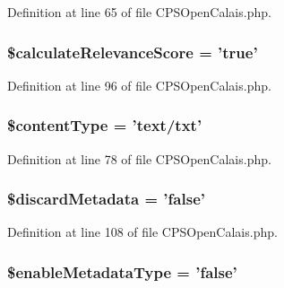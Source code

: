 Definition at line 65 of file CPSOpenCalais.php.

\hypertarget{classCPSOpenCalais_a32ea2c52cbe7a0febc8be98c7ca57195}{
\subsubsection[{\$calculateRelevanceScore}]{\setlength{\rightskip}{0pt plus 5cm}\$calculateRelevanceScore = 'true'}}
\label{classCPSOpenCalais_a32ea2c52cbe7a0febc8be98c7ca57195}


Definition at line 96 of file CPSOpenCalais.php.

\hypertarget{classCPSOpenCalais_ab8c052d0ddebb9f14151f8682916a587}{
\subsubsection[{\$contentType}]{\setlength{\rightskip}{0pt plus 5cm}\$contentType = 'text/txt'}}
\label{classCPSOpenCalais_ab8c052d0ddebb9f14151f8682916a587}


Definition at line 78 of file CPSOpenCalais.php.

\hypertarget{classCPSOpenCalais_a0e3c2633bd75ee4bdb9bc4ad0e498a0c}{
\subsubsection[{\$discardMetadata}]{\setlength{\rightskip}{0pt plus 5cm}\$discardMetadata = 'false'}}
\label{classCPSOpenCalais_a0e3c2633bd75ee4bdb9bc4ad0e498a0c}


Definition at line 108 of file CPSOpenCalais.php.

\hypertarget{classCPSOpenCalais_a465299fb5bd9cc610d83d8cc162a69ef}{
\subsubsection[{\$enableMetadataType}]{\setlength{\rightskip}{0pt plus 5cm}\$enableMetadataType = 'false'}}
\label{classCPSOpenCalais_a465299fb5bd9cc610d83d8cc162a69ef}


